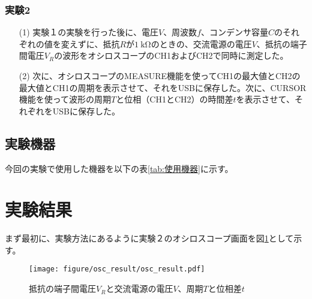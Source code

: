 \documentclass[10pt,a4paper]{jsarticle}
\numberwithin{equation}{section}
\numberwithin{figure}{section}
\numberwithin{table}{section}
\begin{document}
  \subsubsection{実験2}
    \begin{itemize}
      \item [(1)]実験１の実験を行った後に、電圧$V$、周波数$f$、コンデンサ容量$C$のそれぞれの値を変えずに、抵抗$R$が$\SI{1}{\kilo\ohm}$のときの、交流電源の電圧$V$、抵抗の端子間電圧$V_R$の波形をオシロスコープのCH1およびCH2で同時に測定した。
      \item [(2)]次に、オシロスコープのMEASURE機能を使ってCH1の最大値とCH2の最大値とCH1の周期を表示させて、それをUSBに保存した。次に、CURSOR機能を使って波形の周期$T$と位相（CH1とCH2）の時間差$t$を表示させて、それぞれをUSBに保存した。
    \end{itemize}

\subsection{実験機器}
  今回の実験で使用した機器を以下の表\ref{tab:使用機器}に示す。
  \begin{table}[H]
  \caption{使用機器}\label{tab:使用機器}
  \begin{center}
  \end{center}
  \end{table}
  
\section{実験結果}
  まず最初に、実験方法にあるように実験２のオシロスコープ画面を図\ref{fig:osc_result_figure}として示す。
  \begin{figure}[H]
      \centering
        \texttt{[image: figure/osc\_result/osc\_result.pdf]}
        \caption{抵抗の端子間電圧$V_R$と交流電源の電圧$V$、周期$T$と位相差$t$}\label{fig:osc_result_figure}
  \end{figure}
\end{document}
